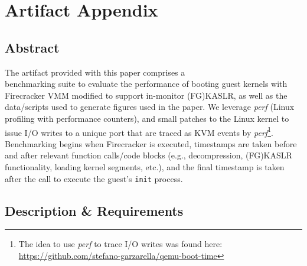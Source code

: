 \documentclass[sigplan,twocolumn]{acmart}
\begin{document}
    
\appendix
\section{Artifact Appendix} 

\subsection{Abstract}

The artifact provided with this paper comprises a \\
benchmarking suite to evaluate the performance
of booting guest kernels with Firecracker VMM modified to support in-monitor (FG)KASLR, as well as the data/scripts
used to generate figures used in the paper.
We leverage \textit{perf} (Linux profiling with performance counters), and small patches to the 
Linux kernel to issue I/O writes to a unique port that are
traced as KVM events by \textit{perf}\footnote{The idea to use \textit{perf} to trace I/O writes was found here: \url{https://github.com/stefano-garzarella/qemu-boot-time}}.
Benchmarking begins when Firecracker is executed,
timestamps are taken before and after relevant function calls/code blocks
(e.g., decompression, (FG)KASLR functionality, loading kernel segments, etc.),
and the final timestamp is taken after the call to execute the guest's \texttt{init} process.


\subsection{Description \& Requirements}

\end{document}

